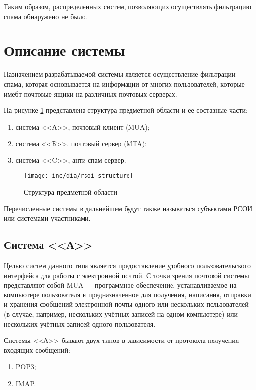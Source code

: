 Таким образом, распределенных систем, позволяющих осуществлять фильтрацию спама обнаружено не было.

\section{Описание системы}
Назначением разрабатываемой системы является осуществление фильтрации спама, которая основывается на информации от многих пользователей, которые имебт почтовые ящики на различных почтовых серверах.

На рисунке \ref{fig:structure} представлена структура предметной области и ее составные части:

\begin{enumerate}
\item{система <<А>>}, почтовый клиент (MUA);
\item{система <<Б>>}, почтовый сервер (MTA);
\item{система <<C>>}, анти-спам сервер. 
\end{enumerate}


\begin{figure}
  \centering
  \texttt{[image: inc/dia/rsoi\_structure]}
  \caption{Структура предметной области}
  \label{fig:structure}
\end{figure}


Перечисленные системы в дальнейшем будут также называться субъектами РСОИ или системами-участниками.

\subsection{Система <<А>>}
Целью систем данного типа является предоставление удобного пользовательского интерфейса для работы с электронной почтой. С точки зрения почтовой системы представляют собой MUA --- программное обеспечение, устанавливаемое на компьютере пользователя и предназначенное для получения, написания, отправки и хранения сообщений электронной почты одного или нескольких пользователей (в случае, например, нескольких учётных записей на одном компьютере) или нескольких учётных записей одного пользователя. 

Системы <<А>> бывают двух типов в зависимости от протокола получения входящих сообщений:
\begin{enumerate}
\item{POP3;}
\item{IMAP.}
\end{enumerate}


